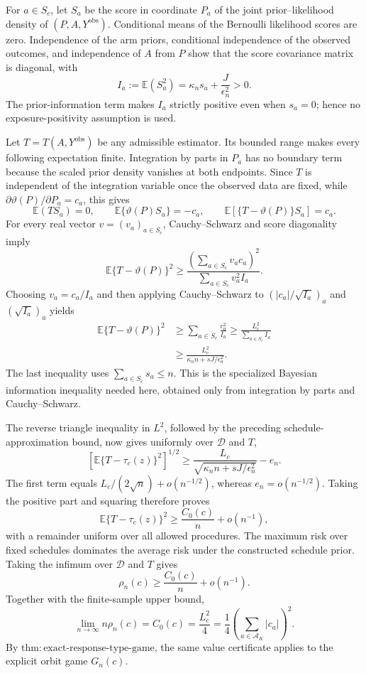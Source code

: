 For \(a\in S_c\), let \(S_a\) be the score in coordinate \(P_a\) of the
joint prior--likelihood density of \((P,A,Y^{\mathrm{obs}})\).  Conditional
means of the Bernoulli likelihood scores are zero.  Independence of the arm
priors, conditional independence of the observed outcomes, and independence
of \(A\) from \(P\) show that the score covariance matrix is diagonal, with
\[
 I_a:=\mathbb E(S_a^2)
 =\kappa_ns_a+\frac{J}{\epsilon_n^2}>0.
\]
The prior-information term makes \(I_a\) strictly positive even when
\(s_a=0\); hence no exposure-positivity assumption is used.

Let \(T=T(A,Y^{\mathrm{obs}})\) be any admissible estimator.  Its bounded
range makes every following expectation finite.  Integration by parts in
\(P_a\) has no boundary term because the scaled prior density vanishes at
both endpoints.  Since \(T\) is independent of the integration variable
once the observed data are fixed, while
\(\partial\vartheta(P)/\partial P_a=c_a\), this gives
\[
 \mathbb E(TS_a)=0,
 \qquad
 \mathbb E\{\vartheta(P)S_a\}=-c_a,
 \qquad
 \mathbb E[\{T-\vartheta(P)\}S_a]=c_a.
\]
For every real vector \(v=(v_a)_{a\in S_c}\), Cauchy--Schwarz and score
diagonality imply
\[
 \mathbb E\{T-\vartheta(P)\}^2
 \ge
 \frac{(\sum_{a\in S_c}v_ac_a)^2}
 {\sum_{a\in S_c}v_a^2I_a}.
\]
Choosing \(v_a=c_a/I_a\) and then applying Cauchy--Schwarz to
\((|c_a|/\sqrt{I_a})_a\) and \((\sqrt{I_a})_a\) yields
\[
 \begin{aligned}
 \mathbb E\{T-\vartheta(P)\}^2
 &\ge\sum_{a\in S_c}\frac{c_a^2}{I_a}
 \ge\frac{L_c^2}{\sum_{a\in S_c}I_a}\\
 &\ge\frac{L_c^2}{\kappa_n n+sJ/\epsilon_n^2}.
 \end{aligned}
\]
The last inequality uses \(\sum_{a\in S_c}s_a\le n\).  This is the
specialized Bayesian information inequality needed here, obtained only
from integration by parts and Cauchy--Schwarz.

The reverse triangle inequality in \(L^2\), followed by the preceding
schedule-approximation bound, now gives uniformly over \(\mathcal D\) and
\(T\),
\[
 \left[\mathbb E\{T-\tau_c(z)\}^2\right]^{1/2}
 \ge
 \frac{L_c}{\sqrt{\kappa_n n+sJ/\epsilon_n^2}}-e_n.
\]
The first term equals \(L_c/(2\sqrt n)+o(n^{-1/2})\), whereas
\(e_n=o(n^{-1/2})\).  Taking the positive part and squaring therefore
proves
\[
 \mathbb E\{T-\tau_c(z)\}^2
 \ge \frac{C_0(c)}n+o(n^{-1}),
\]
with a remainder uniform over all allowed procedures.  The maximum risk
over fixed schedules dominates the average risk under the constructed
schedule prior.  Taking the infimum over \(\mathcal D\) and \(T\) gives
\[
 \rho_n(c)\ge\frac{C_0(c)}n+o(n^{-1}).
\]
Together with the finite-sample upper bound,
\[
 \lim_{n\to\infty}n\rho_n(c)
 =C_0(c)=\frac{L_c^2}{4}
 =\frac14\left(\sum_{a\in\mathcal A_K}|c_a|\right)^2.
\]
By \(\mathrm{thm:exact\text{-}response\text{-}type\text{-}game}\), the same
value certificate applies to the explicit orbit game \(G_n(c)\).

